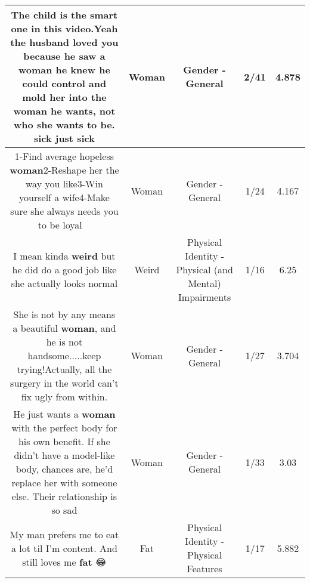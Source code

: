 \documentclass[11pt]{article}
\newlength\mylength
\begin{document}
\begin{center}
\begin{longtable}{|C{.65\mylength}|C{.30\mylength}|C{.12\mylength}|C{.12\mylength}|C{.12\mylength}|}
  \small The child is the smart one in this video.Yeah the husband loved you because he saw a \textbf{woman} he knew he could control and mold her into the \textbf{woman} he wants, not who she wants to be. sick just sick\normalsize   & Woman & Gender - General & 2/41 & 4.878 \\  \hline
  \small 1-Find average hopeless \textbf{woman}2-Reshape her the way you like3-Win yourself a wife4-Make sure she always needs you to be loyal 👍🏼\normalsize   & Woman & Gender - General & 1/24 & 4.167 \\  \hline
  \small I mean kinda \textbf{weird} but he did do a good job like she actually looks normal\normalsize   & Weird & Physical Identity - Physical (and Mental) Impairments & 1/16 & 6.25 \\  \hline
  \small She is not by any means a beautiful \textbf{woman}, and he is not handsome.....keep trying!Actually, all the surgery in the world can't fix ugly from within.\normalsize   & Woman & Gender - General & 1/27 & 3.704 \\  \hline
  \small He just wants a \textbf{woman} with the perfect body for his own benefit. If she didn't have a model-like body, chances are, he'd replace her with someone else. Their relationship is so sad\normalsize   & Woman & Gender - General & 1/33 & 3.03 \\  \hline
  \small My man prefers me to eat a lot til I'm content. And still loves me \textbf{fat} 😂\normalsize   & Fat & Physical Identity - Physical Features & 1/17 & 5.882 \\  \hline

\end{longtable}
\end{center}
\end{document}
